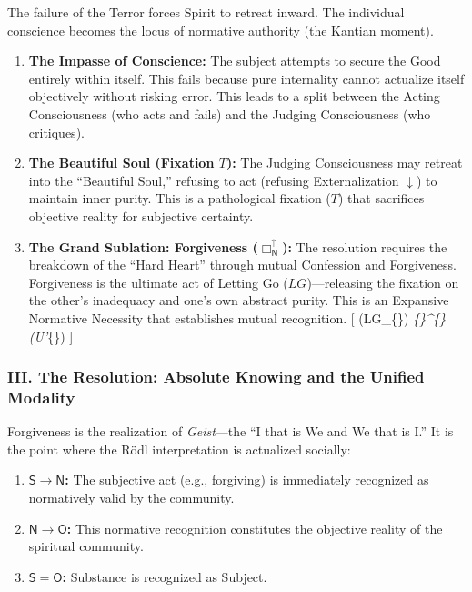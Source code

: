 The failure of the Terror forces Spirit to retreat inward. The individual conscience becomes the locus of normative authority (the Kantian moment).

\begin{enumerate}
\def\labelenumi{\arabic{enumi}.}
\tightlist
\item
  \textbf{The Impasse of Conscience:} The subject attempts to secure the Good entirely within itself. This fails because pure internality cannot actualize itself objectively without risking error. This leads to a split between the Acting Consciousness (who acts and fails) and the Judging Consciousness (who critiques).
\item
  \textbf{The Beautiful Soul (Fixation \(T\)):} The Judging Consciousness may retreat into the ``Beautiful Soul,'' refusing to act (refusing Externalization \(\downarrow\)) to maintain inner purity. This is a pathological fixation (\(T\)) that sacrifices objective reality for subjective certainty.
\item
  \textbf{The Grand Sublation: Forgiveness (\(\Box_{\mathsf{N}}^{\uparrow}\)):} The resolution requires the breakdown of the ``Hard Heart'' through mutual Confession and Forgiveness. Forgiveness is the ultimate act of Letting Go (\(LG\))---releasing the fixation on the other's inadequacy and one's own abstract purity. This is an Expansive Normative Necessity that establishes mutual recognition. {[} (LG\_\{\}) \implies \Box\emph{\{\}\^{}\{\uparrow\}(U'}\{\}) {]}
\end{enumerate}

\subsubsection{III. The Resolution: Absolute Knowing and the Unified Modality}\label{iii.-the-resolution-absolute-knowing-and-the-unified-modality}

Forgiveness is the realization of \emph{Geist}---the ``I that is We and We that is I.'' It is the point where the Rödl interpretation is actualized socially:

\begin{enumerate}
\def\labelenumi{\arabic{enumi}.}
\tightlist
\item
  \textbf{\(\mathsf{S} \rightarrow \mathsf{N}\):} The subjective act (e.g., forgiving) is immediately recognized as normatively valid by the community.
\item
  \textbf{\(\mathsf{N} \rightarrow \mathsf{O}\):} This normative recognition constitutes the objective reality of the spiritual community.
\item
  \textbf{\(\mathsf{S} = \mathsf{O}\):} Substance is recognized as Subject.
\end{enumerate}

